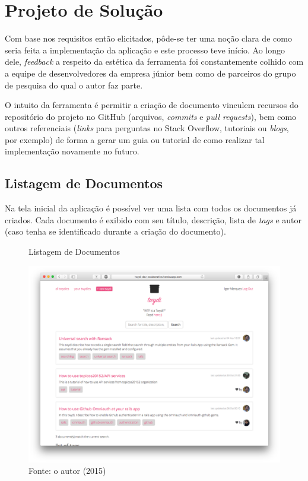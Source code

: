 \chapter{Projeto de Solução}

Com base nos requisitos então elicitados, pôde-se ter uma noção clara de como seria feita a implementação da aplicação e este processo teve início. Ao longo dele, \textit{feedback} a respeito da estética da ferramenta foi constantemente colhido com a equipe de desenvolvedores da empresa júnior bem como de parceiros do grupo de pesquisa do qual o autor faz parte.

O intuito da ferramenta é permitir a criação de documento vinculem recursos do repositório do projeto no GitHub (arquivos, \textit{commits} e \textit{pull requests}), bem como outros referenciais (\textit{links} para perguntas no Stack Overflow, tutoriais ou \textit{blogs}, por exemplo) de forma a gerar um guia ou tutorial de como realizar tal implementação novamente no futuro.

\section{Listagem de Documentos}

Na tela inicial da aplicação é possível ver uma lista com todos os documentos já criados. Cada documento é exibido com seu título, descrição, lista de \textit{tags} e autor (caso tenha se identificado durante a criação do documento).

\begin{figure}[h]
	\centering
    \caption{Listagem de Documentos}
    \includegraphics[width=15cm]{Imagens/print-lista-1.png}
	\caption*{Fonte: o autor (2015)}
\end{figure}

